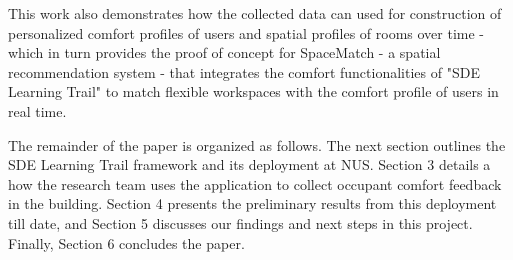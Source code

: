 This work also demonstrates how the collected data can used for construction of personalized comfort profiles of users and spatial profiles of rooms over time - which in turn provides the proof of concept for SpaceMatch - a spatial recommendation system - that integrates the comfort functionalities of "SDE Learning Trail" to match flexible workspaces with the comfort profile of users in real time.

The remainder of the paper is organized as follows. The next section outlines the SDE Learning Trail framework and its deployment at NUS. Section 3 details a how the research team uses the application to collect occupant comfort feedback in the building. Section 4 presents the preliminary results from this deployment till date, and Section 5 discusses our findings and next steps in this project. Finally, Section 6 concludes the paper. 







